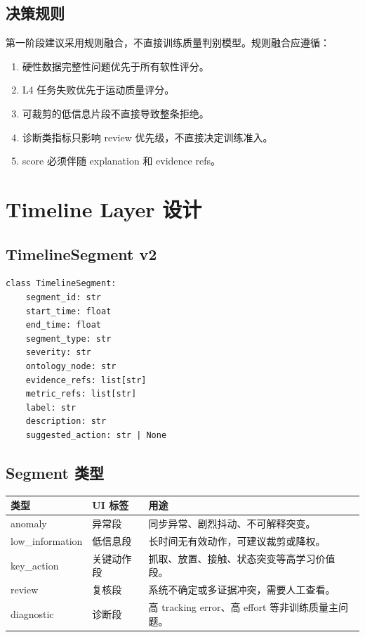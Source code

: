 \documentclass[UTF8,zihao=-4,oneside,openany]{ctexrep}
\begin{document}
\subsection{决策规则}

第一阶段建议采用规则融合，不直接训练质量判别模型。规则融合应遵循：

\begin{enumerate}
\item 硬性数据完整性问题优先于所有软性评分。
\item L4 任务失败优先于运动质量评分。
\item 可裁剪的低信息片段不直接导致整条拒绝。
\item 诊断类指标只影响 review 优先级，不直接决定训练准入。
\item score 必须伴随 explanation 和 evidence refs。
\end{enumerate}

\section{Timeline Layer 设计}

\subsection{TimelineSegment v2}

\begin{verbatim}
class TimelineSegment:
    segment_id: str
    start_time: float
    end_time: float
    segment_type: str
    severity: str
    ontology_node: str
    evidence_refs: list[str]
    metric_refs: list[str]
    label: str
    description: str
    suggested_action: str | None
\end{verbatim}

\subsection{Segment 类型}

\begin{longtable}{L{3.5cm} L{4cm} L{6cm}}
\toprule
类型 & UI 标签 & 用途 \\
\midrule
anomaly & 异常段 & 同步异常、剧烈抖动、不可解释突变。 \\
low\_information & 低信息段 & 长时间无有效动作，可建议裁剪或降权。 \\
key\_action & 关键动作段 & 抓取、放置、接触、状态突变等高学习价值段。 \\
review & 复核段 & 系统不确定或多证据冲突，需要人工查看。 \\
diagnostic & 诊断段 & 高 tracking error、高 effort 等非训练质量主问题。 \\
\bottomrule
\end{longtable}
\end{document}
